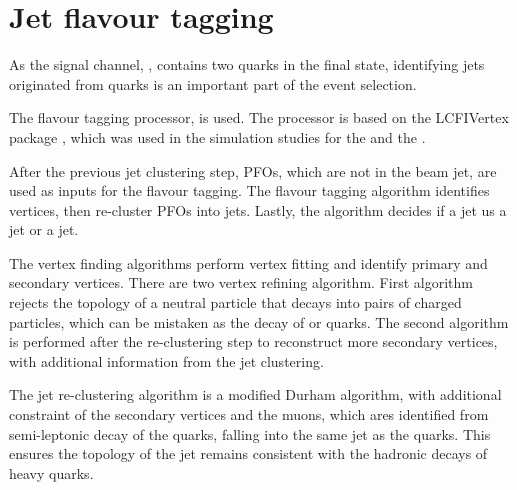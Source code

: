 \section{Jet flavour tagging}
\label{sec:doubleHiggsFlavourTagging}

As the signal channel, \eeToHHbbWWHad,  contains two \Pbottom quarks in the final state, identifying jets originated from \Pbottom quarks is an important part of the event selection.



The flavour tagging processor, \lcfiplus \cite{Suehara:2015ura} is used. The processor is based on the LCFIVertex package \cite{Bailey:2009ui}, which was used in the simulation studies for the \ILCloi \cite{Abe:2010aa,Aihara:2009ad} and the \CLICcdr \cite{Linssen:2012hp}.

After the previous jet clustering step, PFOs, which are not in the beam jet, are used as inputs for the flavour tagging. The flavour tagging algorithm identifies vertices, then re-cluster PFOs into jets. Lastly, the algorithm decides if a jet us a \Pbottom jet or a \Pcharm jet.


The vertex finding algorithms perform vertex fitting and identify primary and secondary vertices. There are two vertex refining algorithm. First algorithm rejects the topology of a  neutral particle that decays into pairs of charged particles, which can be mistaken as  the decay of \Pbottom or \Pcharm quarks. The second algorithm is performed after the re-clustering step to reconstruct more secondary vertices, with additional information from the jet clustering.

The jet re-clustering algorithm is a modified Durham algorithm, with additional constraint of the secondary vertices and the muons, which ares identified from semi-leptonic decay of the quarks, falling into the same  jet as the quarks. This ensures the topology of the jet remains consistent with the hadronic decays of heavy quarks.


